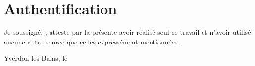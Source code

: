 
\chapter*{Authentification}

Je soussigné, \theauthor, atteste par la présente avoir réalisé seul ce travail et n'avoir utilisé aucune autre source que celles expressément mentionnées.

\vfil
{\relax\theauthor\par
    \ifdefined\thesignature
        \printsignature

    \fi
}
\vfil
Yverdon-les-Bains, le \thedate